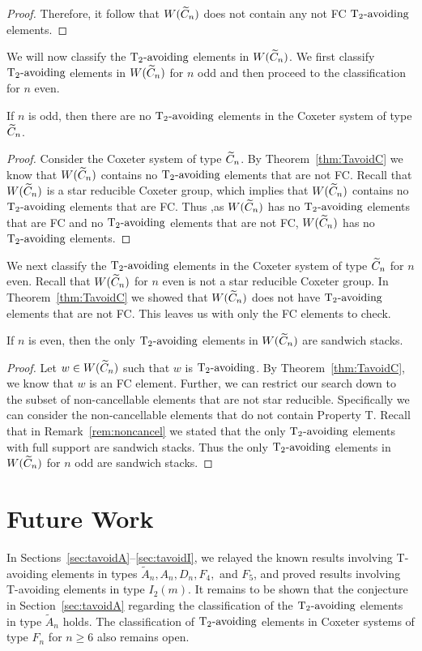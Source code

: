 \begin{theorem}
\begin{proof}
	Therefore, it follow that $W(\widetilde{C}_n)$ does not contain any not FC $\operatorname{T_2-\mathrm{avoiding}}$ elements. 
\end{proof}
\end{theorem}

We will now classify the $\operatorname{T_2-\mathrm{avoiding}}$ elements in $W(\widetilde{C}_n)$. We first classify $\operatorname{T_2-\mathrm{avoiding}}$ elements in $W(\widetilde{C}_n)$ for $n$ odd and then proceed to the classification for $n$ even.

\begin{theorem}
	If $n$ is odd, then there are no $\operatorname{T_2-\mathrm{avoiding}}$ elements in the Coxeter system of type $\widetilde{C}_n$.
	\begin{proof}
		Consider the Coxeter system of type $\widetilde{C}_n$. By Theorem~\ref{thm:TavoidC} we know that $W(\widetilde{C}_n)$ contains no $\operatorname{T_2-\mathrm{avoiding}}$ elements that are not FC. Recall that $W(\widetilde{C}_n)$ is a star reducible Coxeter group, which implies that $W(\widetilde{C}_n)$ contains no $\operatorname{T_2-\mathrm{avoiding}}$ elements that are FC. Thus ,as $W(\widetilde{C}_n)$ has no $\operatorname{T_2-\mathrm{avoiding}}$ elements that are FC and no $\operatorname{T_2-\mathrm{avoiding}}$ elements that are not FC, $W(\widetilde{C}_n)$ has no $\operatorname{T_2-\mathrm{avoiding}}$ elements.
	\end{proof}
\end{theorem}

We next classify the $\operatorname{T_2-\mathrm{avoiding}}$ elements in the Coxeter system of type $\widetilde{C}_n$ for $n$ even. Recall that $W(\widetilde{C}_n)$ for $n$ even is not a star reducible Coxeter group. In Theorem~\ref{thm:TavoidC} we showed that $W(\widetilde{C}_n)$ does not have $\operatorname{T_2-\mathrm{avoiding}}$ elements that are not FC. This leaves us with only the FC elements to check.

\begin{theorem}
	If $n$ is even, then the only $\operatorname{T_2-\mathrm{avoiding}}$ elements in $W(\widetilde{C}_n)$ are sandwich stacks.
	\begin{proof}
		Let $w \in W(\widetilde{C}_n)$ such that $w$ is $\operatorname{T_2-\mathrm{avoiding}}$. By Theorem~\ref{thm:TavoidC}, we know that $w$ is an FC element. Further, we can restrict our search down to the subset of non-cancellable elements that are not star reducible. Specifically we can consider the non-cancellable elements that do not contain Property T. Recall that in Remark~\ref{rem:noncancel} we stated that the only $\operatorname{T_2-\mathrm{avoiding}}$ elements with full support are sandwich stacks. Thus the only $\operatorname{T_2-\mathrm{avoiding}}$ elements in $W(\widetilde{C}_n)$ for $n$ odd are sandwich stacks.
	\end{proof}
\end{theorem}


\section{Future Work}\label{sec:open}
In Sections~\ref{sec:tavoidA}--\ref{sec:tavoidI}, we relayed the known results involving T-avoiding elements in types $\widetilde{A}_n, A_n, D_n, F_4,$ and $F_5$, and proved results involving T-avoiding elements in type $I_2(m)$. It remains to be shown that the conjecture in Section~\ref{sec:tavoidA} regarding the classification of the $\operatorname{T_2-\mathrm{avoiding}}$ elements in type $\widetilde{A}_n$ holds. The classification of $\operatorname{T_2-\mathrm{avoiding}}$ elements in Coxeter systems of type $F_n$ for $n \geq 6$ also remains open.

